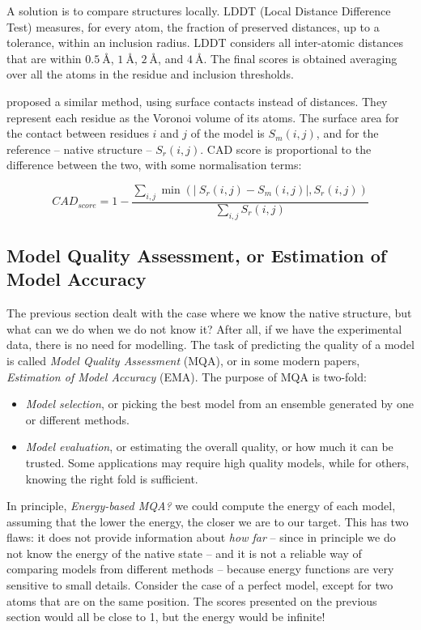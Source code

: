A solution is to compare structures locally. 
LDDT (Local Distance Difference Test) \citep{lddt} 
measures, for every atom, the fraction of preserved  distances, up to a tolerance, within an inclusion radius.
LDDT considers all inter-atomic distances that are within $\SI{0.5}{\angstrom}$, $\SI{1}{\angstrom}$, $\SI{2}{\angstrom}$, and $\SI{4}{\angstrom}$.
The final scores is obtained averaging over all the atoms in the residue and inclusion thresholds.

\citet{cad} proposed a similar method, using surface contacts instead of distances. 
They represent each residue as the Voronoi volume of its atoms.
The surface area for the contact between residues $i$ and $j$ of the model is $S_m(i,j)$, and for the reference -- native structure -- $S_r(i,j)$.
CAD score is proportional to the difference between the two, with some normalisation terms:

\begin{equation*}
CAD_{score} = 1 - \frac{\sum_{i,j} \min\left( \left| \: S_{r}(i, j) - S_{m}(i, j)\right|, S_{r}(i, j)\right)}{\sum_{i,j} S_{r}(i, j)}
\end{equation*}

\subsection[Model Quality Assessment]{Model Quality Assessment, or Estimation of Model Accuracy}
The previous section dealt with the case where we know the native structure, but what can we do when we do not know it?
After all, if we have the experimental data, there is no need for modelling.
The task of predicting the quality of a model is called \emph{Model Quality Assessment} (MQA), or in some modern papers, \emph{Estimation of Model Accuracy} (EMA).
The purpose of MQA is two-fold:

\begin{itemize}
\item \emph{Model selection}, or picking the best model from an ensemble generated by one or different methods.
\item \emph{Model evaluation}, or estimating the overall quality, or how much it can be trusted.
Some applications may require high quality models, while for others, knowing the right fold is sufficient.
\end{itemize}

In principle, \emph{Energy-based MQA?} we could compute the energy of each model, assuming that the lower the energy, the closer we are to our target.
This has two flaws: it does not provide information about \emph{how far} -- since in principle we do not know the energy of the native state -- and it is not a reliable way of comparing models from different methods -- because energy functions are very sensitive to small details.
Consider the case of a perfect model, except for two atoms that are on the same position.
The scores presented on the previous section would all be close to 1, but the energy would be infinite!

